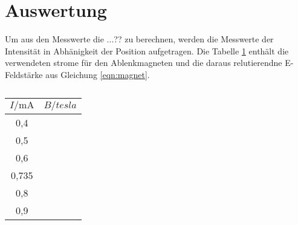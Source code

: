 \section{Auswertung}
\label{sec:Auswertung}
Um aus den Messwerte die ...?? zu berechnen, werden die
Messwerte der Intensität in Abhänigkeit der Position aufgetragen.
Die Tabelle \ref{tab:strom} enthält die verwendeten strome für den
Ablenkmagneten und die daraus relutierendne E-Feldstärke aus
Gleichung \ref{eqn:magnet}.
\begin{table}
\centering
\caption{}
\label{tab:strom}
\begin{tabular}{c c}
\toprule
 $I/\si{\milli\ampere}$ & $B/\si{tesla}$ \\
\midrule
0,4  &   \\
0,5  &   \\
0,6  &   \\
0,735&   \\
0,8  &   \\
0,9  &   \\ 
\bottomrule
\end{tabular}
\end{table}
